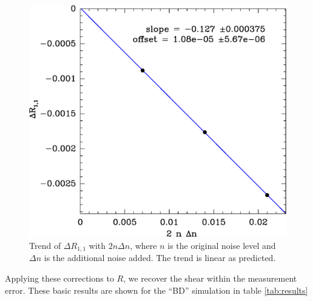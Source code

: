 \documentclass[usegraphicx,usenatbib]{mn2e}
\begin{document}
\begin{figure}
    \includegraphics[scale=0.45]{run-bd13mcal-dt02-Rnoise-detrend-R11.eps}

    \caption{Trend of $\Delta R_{1,1}$ with $2 n \Delta n$, where $n$ is the
    original noise level and $\Delta n$ is the additional noise added.  The
trend is linear  as predicted.}

\label{fig:detrend}
\end{figure}

Applying these corrections to $R$, we recover the shear within the
measurement error. These basic results are shown for the ``BD'' simulation
in table \ref{tab:results}
\end{document}
